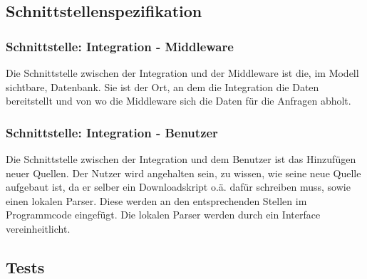 \subsection{Schnittstellenspezifikation}
\subsubsection{Schnittstelle: Integration - Middleware}
Die Schnittstelle zwischen der Integration und der Middleware ist die, im Modell sichtbare, Datenbank. Sie ist der Ort, an dem die Integration die Daten bereitstellt und von wo die Middleware sich die Daten für die Anfragen abholt.
\subsubsection{Schnittstelle: Integration - Benutzer}
Die Schnittstelle zwischen der Integration und dem Benutzer ist das Hinzufügen neuer Quellen. Der Nutzer wird angehalten sein, zu wissen, wie seine neue Quelle aufgebaut ist, da er selber ein Downloadskript o.ä. dafür schreiben muss, sowie einen lokalen Parser. Diese werden an den entsprechenden Stellen im Programmcode eingefügt. Die lokalen Parser werden durch ein Interface vereinheitlicht.
\subsection{Tests}
